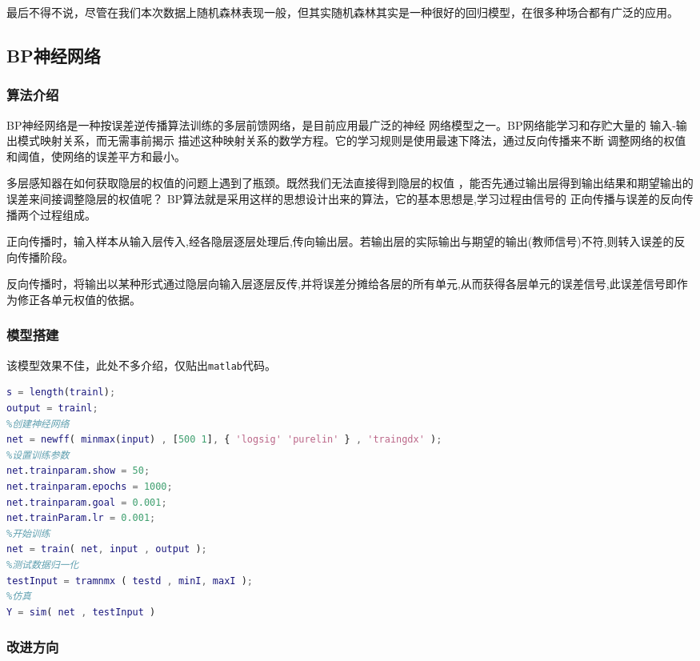 \documentclass[11pt,a4paper]{elegantpaper}
\begin{document}
\begin{multicols}{2}
最后不得不说，尽管在我们本次数据上随机森林表现一般，但其实随机森林其实是一种很好的回归模型，在很多种场合都有广泛的应用。

\subsection{BP神经网络}

\subsubsection{算法介绍}

BP神经网络是一种按误差逆传播算法训练的多层前馈网络，是目前应用最广泛的神经
网络模型之一。BP网络能学习和存贮大量的 输入-输出模式映射关系，而无需事前揭示
描述这种映射关系的数学方程。它的学习规则是使用最速下降法，通过反向传播来不断
调整网络的权值和阈值，使网络的误差平方和最小。

多层感知器在如何获取隐层的权值的问题上遇到了瓶颈。既然我们无法直接得到隐层的权值
，能否先通过输出层得到输出结果和期望输出的误差来间接调整隐层的权值呢？
BP算法就是采用这样的思想设计出来的算法，它的基本思想是,学习过程由信号的
正向传播与误差的反向传播两个过程组成。

正向传播时，输入样本从输入层传入,经各隐层逐层处理后,传向输出层。若输出层的实际输出与期望的输出(教师信号)不符,则转入误差的反向传播阶段。

反向传播时，将输出以某种形式通过隐层向输入层逐层反传,并将误差分摊给各层的所有单元,从而获得各层单元的误差信号,此误差信号即作为修正各单元权值的依据。

\subsubsection{模型搭建}

该模型效果不佳，此处不多介绍，仅贴出\lstinline{matlab}代码。

\begin{lstlisting}[language=matlab]
%构造输出矩阵
s = length(trainl);
output = trainl;
%创建神经网络
net = newff( minmax(input) , [500 1], { 'logsig' 'purelin' } , 'traingdx' ); 
%设置训练参数
net.trainparam.show = 50;
net.trainparam.epochs = 1000;
net.trainparam.goal = 0.001;
net.trainParam.lr = 0.001;
%开始训练
net = train( net, input , output );
%测试数据归一化
testInput = tramnmx ( testd , minI, maxI );
%仿真
Y = sim( net , testInput )
\end{lstlisting}

\subsubsection{改进方向}


\end{multicols}
\end{document}
